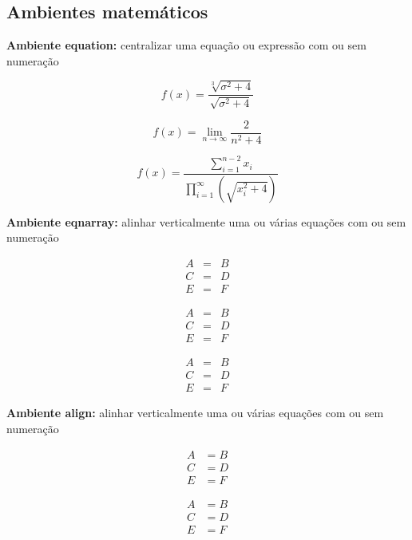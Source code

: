 \documentclass[12pt]{article}
\begin{document}
\subsection{Ambientes matemáticos}
\noindent \textbf{Ambiente equation:} centralizar uma equação ou expressão com ou sem numeração

\begin{equation}
    f(x) = \dfrac{\sqrt[3]{\sigma^2+4}}{\sqrt{\sigma^2+4}}
\end{equation}

\begin{equation*}
    f(x) = \lim_{n\to \infty}\dfrac{2}{n^2+4}
\end{equation*}

\begin{equation}
    f(x) = \dfrac{\displaystyle\sum_{i=1}^{n-2} x_i}{\displaystyle\prod_{i=1}^\infty\left(\sqrt{x^2_i+4}\right)}
\end{equation}

\noindent \textbf{Ambiente eqnarray:} alinhar verticalmente uma ou várias equações com ou sem numeração

\begin{eqnarray*} %
A & = & B\\
C & = & D\\
E & = & F
\end{eqnarray*}

\begin{eqnarray} %
A & = & B\\ 
C & = & D\\ 
E & = & F
\end{eqnarray}

\begin{eqnarray} 
A & = & B\\ 
\nonumber C & = & D\\  %
\nonumber E & = & F
\end{eqnarray}


\noindent \textbf{Ambiente align:} alinhar verticalmente uma ou várias equações com ou sem numeração

\begin{align*}
A & = B\\
C & = D\\
E & = F
\end{align*}

\begin{align}
A & = B\\
C & = D\\ 
\nonumber E & = F
\end{align}
\end{document}
